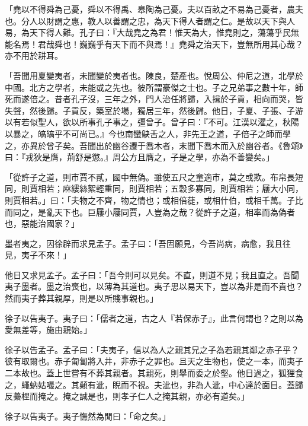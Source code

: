\documentclass[12pt,a4paper]{ctexbook}
\begin{document}
「堯以不得舜為己憂，舜以不得禹、皋陶為己憂。夫以百畝之不易為己憂者，農夫也。分人以財謂之惠，教人以善謂之忠，為天下得人者謂之仁。是故以天下與人易，為天下得人難。孔子曰：『大哉堯之為君！惟天為大，惟堯則之，蕩蕩乎民無能名焉！君哉舜也！巍巍乎有天下而不與焉！』堯舜之治天下，豈無所用其心哉？亦不用於耕耳。\par
「吾聞用夏變夷者，未聞變於夷者也。陳良，楚產也。悅周公、仲尼之道，北學於中國。北方之學者，未能或之先也。彼所謂豪傑之士也。子之兄弟事之數十年，師死而遂倍之。昔者孔子沒，三年之外，門人治任將歸，入揖於子貢，相向而哭，皆失聲，然後歸。子貢反，築室於場，獨居三年，然後歸。他日，子夏、子張、子游以有若似聖人，欲以所事孔子事之，彊曾子。曾子曰：『不可。江漢以濯之，秋陽以暴之，皜皜乎不可尚已。』今也南蠻鴃舌之人，非先王之道，子倍子之師而學之，亦異於曾子矣。吾聞出於幽谷遷于喬木者，末聞下喬木而入於幽谷者。《魯頌》曰：『戎狄是膺，荊舒是懲。』周公方且膺之，子是之學，亦為不善變矣。」\par
「從許子之道，則市賈不貳，國中無偽。雖使五尺之童適市，莫之或欺。布帛長短同，則賈相若；麻縷絲絮輕重同，則賈相若；五穀多寡同，則賈相若；屨大小同，則賈相若。」曰：「夫物之不齊，物之情也；或相倍蓰，或相什伯，或相千萬。子比而同之，是亂天下也。巨屨小屨同賈，人豈為之哉？從許子之道，相率而為偽者也，惡能治國家？」\par
墨者夷之，因徐辟而求見孟子。孟子曰：「吾固願見，今吾尚病，病愈，我且往見，夷子不來！」\par
他日又求見孟子。孟子曰：「吾今則可以見矣。不直，則道不見；我且直之。吾聞夷子墨者。墨之治喪也，以薄為其道也。夷子思以易天下，豈以為非是而不貴也？然而夷子葬其親厚，則是以所賤事親也。」\par
徐子以告夷子。夷子曰：「儒者之道，古之人『若保赤子』，此言何謂也？之則以為愛無差等，施由親始。」\par
徐子以告孟子。孟子曰：「夫夷子，信以為人之親其兄之子為若親其鄰之赤子乎？彼有取爾也。赤子匍匐將入井，非赤子之罪也。且天之生物也，使之一本，而夷子二本故也。蓋上世嘗有不葬其親者。其親死，則舉而委之於壑。他日過之，狐狸食之，蠅蚋姑嘬之。其顙有泚，睨而不視。夫泚也，非為人泚，中心達於面目。蓋歸反虆梩而掩之。掩之誠是也，則孝子仁人之掩其親，亦必有道矣。」\par
徐子以告夷子。夷子憮然為閒曰：「命之矣。」\par
\end{document}
